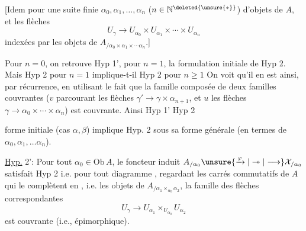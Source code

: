 [Idem pour une suite finie  $\alpha_0,\alpha_1,\ldots,\alpha_n$ ($n\in\mathbb N^{\deleted{\unsure{*}}}$) d'objets de $A$, et les  flèches
\[U_\gamma\longrightarrow U_{\alpha_0}\times U_{\alpha_1}\times\cdots\times U_{\alpha_n}\]
indexées par les objets de $A_{/\alpha_0\times\alpha_1\times\cdots\alpha_n}$.]

Pour $n=0$, on retrouve Hyp 1', pour $n=1$, la formulation initiale de Hyp 2. Mais Hyp 2 pour $n=1$ implique-t-il Hyp 2 pour  $n\geq1$ On voit qu'il en est ainsi, par récurrence, en utilisant le fait que la famille composée de deux familles couvrantes
($v$ parcourant les flèches $\gamma'\longrightarrow\gamma\times\alpha_{n+1}$, et $u$ les flèches  $\gamma\longrightarrow\alpha_0\times\cdots\times\alpha_n$) est couvrante. Ainsi Hyp 1'  \inserted{$+$} Hyp 2


forme initiale (cas $\alpha,\beta$) implique Hyp. 2 sous sa forme générale (en termes de $\alpha_0,\alpha_1,\ldots\alpha_n$).

\uline{Hyp.} 2': Pour tout $\alpha_0\in\mathrm{Ob}\,A$, le foncteur induit $A_{/\alpha_0}\unsure{\xrightarrow{\varphi}|\twoheadrightarrow|\longrightarrow}\mathcal X_{/\alpha_0}$ satisfait  Hyp 2 i.e. pour tout diagramme
, regardant les carrés commutatifs de $A$ qui le complètent en
, i.e. les objets de $A_{/\alpha_1\times_{\alpha_0}\alpha_2}$, la famille des flèches correspondantes
\[U_\gamma\longrightarrow U_{\alpha_1}\times_{U_{\alpha_0}}U_{\alpha_2}\]
est couvrante (i.e., épimorphique).


